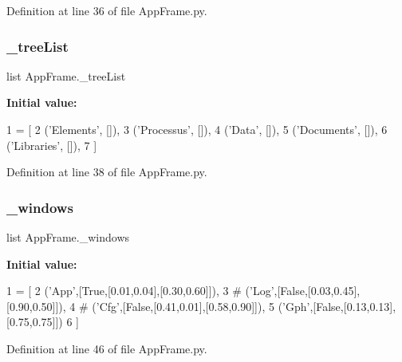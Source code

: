 Definition at line 36 of file App\+Frame.\+py.

\mbox{\label{namespaceAppFrame_a8925d0dfd02fc868328ba29c830445db}} 
\subsubsection{\texorpdfstring{\+\_\+tree\+List}{\_treeList}}
{\footnotesize\ttfamily list App\+Frame.\+\_\+tree\+List\hspace{0.3cm}{\ttfamily [private]}}

{\bfseries Initial value\+:}
\begin{DoxyCode}
1 =  [
2     (\textcolor{stringliteral}{'Elements'},  []),
3     (\textcolor{stringliteral}{'Processus'}, []),
4     (\textcolor{stringliteral}{'Data'},      []),
5     (\textcolor{stringliteral}{'Documents'}, []),
6     (\textcolor{stringliteral}{'Libraries'}, []),
7 ]
\end{DoxyCode}


Definition at line 38 of file App\+Frame.\+py.

\mbox{\label{namespaceAppFrame_a027b5aeacdf457fd7ca6f3303fe51985}} 
\subsubsection{\texorpdfstring{\+\_\+windows}{\_windows}}
{\footnotesize\ttfamily list App\+Frame.\+\_\+windows\hspace{0.3cm}{\ttfamily [private]}}

{\bfseries Initial value\+:}
\begin{DoxyCode}
1 =  [
2             (\textcolor{stringliteral}{'App'},[\textcolor{keyword}{True},[0.01,0.04],[0.30,0.60]]),
3 \textcolor{comment}{#            ('Log',[False,[0.03,0.45],[0.90,0.50]]),}
4 \textcolor{comment}{#            ('Cfg',[False,[0.41,0.01],[0.58,0.90]]),}
5             (\textcolor{stringliteral}{'Gph'},[\textcolor{keyword}{False},[0.13,0.13],[0.75,0.75]])
6             ]
\end{DoxyCode}


Definition at line 46 of file App\+Frame.\+py.

